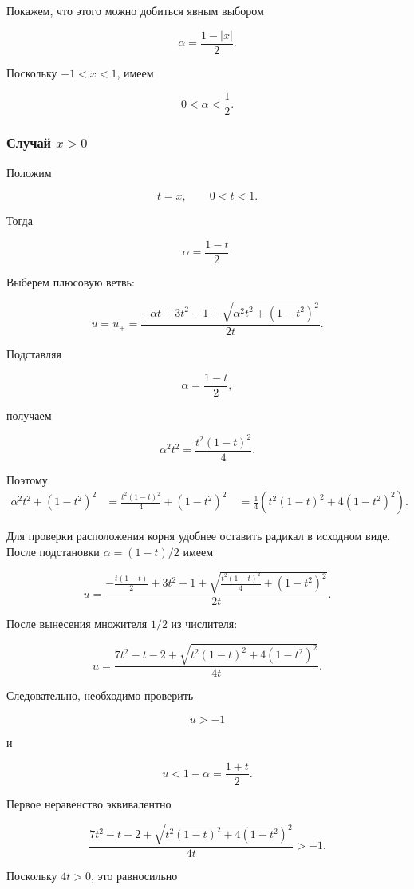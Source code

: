 \documentclass[12pt,a4paper]{article}
\begin{document}
	Покажем, что этого можно добиться явным выбором
	
	$$
	\boxed{
		\alpha=\frac{1-|x|}{2}.
	}
	$$
	
	Поскольку $-1<x<1$, имеем
	
	$$
	\boxed{
		0<\alpha<\frac12.
	}
	$$
	
	
	\subsubsection{Случай $x>0$}
	
	Положим
	
	$$
	t=x,\qquad 0<t<1.
	$$
	
	Тогда
	
	$$
	\alpha=\frac{1-t}{2}.
	$$
	
	Выберем плюсовую ветвь:
	
	$$
	u=u_+
	=
	\frac{
		-\alpha t+3t^2-1
		+
		\sqrt{\alpha^2t^2+(1-t^2)^2}
	}{2t}.
	$$
	
	Подставляя
	
	$$
	\alpha=\frac{1-t}{2},
	$$
	
	получаем
	
	$$
	\alpha^2t^2
	=
	\frac{t^2(1-t)^2}{4}.
	$$
	
	Поэтому
	\begin{align*}
		\alpha^2t^2+(1-t^2)^2
		&=
		\frac{t^2(1-t)^2}{4}
		+(1-t^2)^2\
		&=
		\frac14
		\left(
		t^2(1-t)^2+4(1-t^2)^2
		\right).
	\end{align*}

	
	Для проверки расположения корня удобнее оставить радикал в исходном виде. После подстановки $\alpha=(1-t)/2$ имеем
	
	$$
	u
	=
	\frac{
		-\frac{t(1-t)}2+3t^2-1
		+
		\sqrt{
			\frac{t^2(1-t)^2}{4}+(1-t^2)^2
		}
	}{2t}.
	$$
	
	После вынесения множителя $1/2$ из числителя:
	
	$$
	\boxed{
		u=
		\frac{
			7t^2-t-2+
			\sqrt{
				t^2(1-t)^2+4(1-t^2)^2
			}
		}{4t}.
	}
	$$
	
	Следовательно, необходимо проверить
	
	$$
	u>-1
	$$
	
	и
	
	$$
	u<1-\alpha=\frac{1+t}{2}.
	$$
	
	Первое неравенство эквивалентно
	
	$$
	\frac{
		7t^2-t-2+
		\sqrt{
			t^2(1-t)^2+4(1-t^2)^2
		}
	}{4t}>-1.
	$$
	
	Поскольку $4t>0$, это равносильно
	
\end{document}
